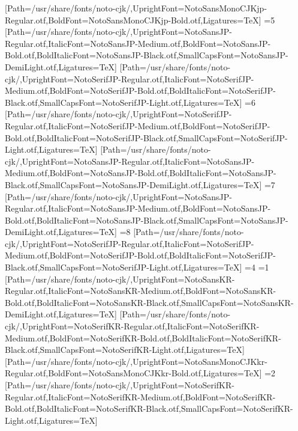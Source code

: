 [Path=/usr/share/fonts/noto-cjk/,UprightFont=NotoSansMonoCJKjp-Regular.otf,BoldFont=NotoSansMonoCJKjp-Bold.otf,Ligatures=TeX]
\else\ifnum\value{CJKFonts}=5
[Path=/usr/share/fonts/noto-cjk/,UprightFont=NotoSansJP-Regular.otf,ItalicFont=NotoSansJP-Medium.otf,BoldFont=NotoSansJP-Bold.otf,BoldItalicFont=NotoSansJP-Black.otf,SmallCapsFont=NotoSansJP-DemiLight.otf,Ligatures=TeX]
[Path=/usr/share/fonts/noto-cjk/,UprightFont=NotoSerifJP-Regular.otf,ItalicFont=NotoSerifJP-Medium.otf,BoldFont=NotoSerifJP-Bold.otf,BoldItalicFont=NotoSerifJP-Black.otf,SmallCapsFont=NotoSerifJP-Light.otf,Ligatures=TeX]
\else\ifnum\value{CJKFonts}=6
[Path=/usr/share/fonts/noto-cjk/,UprightFont=NotoSerifJP-Regular.otf,ItalicFont=NotoSerifJP-Medium.otf,BoldFont=NotoSerifJP-Bold.otf,BoldItalicFont=NotoSerifJP-Black.otf,SmallCapsFont=NotoSerifJP-Light.otf,Ligatures=TeX]
[Path=/usr/share/fonts/noto-cjk/,UprightFont=NotoSansJP-Regular.otf,ItalicFont=NotoSansJP-Medium.otf,BoldFont=NotoSansJP-Bold.otf,BoldItalicFont=NotoSansJP-Black.otf,SmallCapsFont=NotoSansJP-DemiLight.otf,Ligatures=TeX]
\else\ifnum\value{CJKFonts}=7
[Path=/usr/share/fonts/noto-cjk/,UprightFont=NotoSansJP-Regular.otf,ItalicFont=NotoSansJP-Medium.otf,BoldFont=NotoSansJP-Bold.otf,BoldItalicFont=NotoSansJP-Black.otf,SmallCapsFont=NotoSansJP-DemiLight.otf,Ligatures=TeX]
\else\ifnum\value{CJKFonts}=8
[Path=/usr/share/fonts/noto-cjk/,UprightFont=NotoSerifJP-Regular.otf,ItalicFont=NotoSerifJP-Medium.otf,BoldFont=NotoSerifJP-Bold.otf,BoldItalicFont=NotoSerifJP-Black.otf,SmallCapsFont=NotoSerifJP-Light.otf,Ligatures=TeX]
\fi\fi\fi\fi\fi\fi\fi\fi\else
\ifnum\value{CJKLanguage}=4
\ifnum\value{CJKFonts}=1
[Path=/usr/share/fonts/noto-cjk/,UprightFont=NotoSansKR-Regular.otf,ItalicFont=NotoSansKR-Medium.otf,BoldFont=NotoSansKR-Bold.otf,BoldItalicFont=NotoSansKR-Black.otf,SmallCapsFont=NotoSansKR-DemiLight.otf,Ligatures=TeX]
[Path=/usr/share/fonts/noto-cjk/,UprightFont=NotoSerifKR-Regular.otf,ItalicFont=NotoSerifKR-Medium.otf,BoldFont=NotoSerifKR-Bold.otf,BoldItalicFont=NotoSerifKR-Black.otf,SmallCapsFont=NotoSerifKR-Light.otf,Ligatures=TeX]
[Path=/usr/share/fonts/noto-cjk/,UprightFont=NotoSansMonoCJKkr-Regular.otf,BoldFont=NotoSansMonoCJKkr-Bold.otf,Ligatures=TeX]
\else\ifnum\value{CJKFonts}=2
[Path=/usr/share/fonts/noto-cjk/,UprightFont=NotoSerifKR-Regular.otf,ItalicFont=NotoSerifKR-Medium.otf,BoldFont=NotoSerifKR-Bold.otf,BoldItalicFont=NotoSerifKR-Black.otf,SmallCapsFont=NotoSerifKR-Light.otf,Ligatures=TeX]
